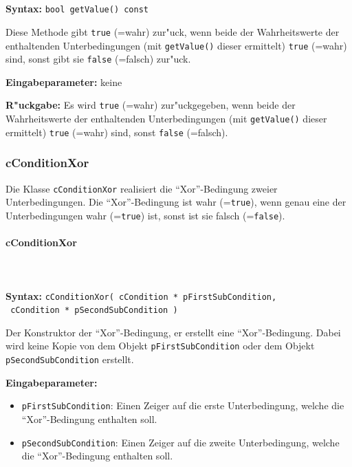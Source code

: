 \ \\\\\noindent
\textbf{Syntax:} \verb|bool getValue() const|

\bigskip\noindent
Diese Methode gibt \verb|true| (=wahr) zur"uck, wenn beide der Wahrheitswerte der enthaltenden Unterbedingungen (mit \verb|getValue()| dieser ermittelt) \verb|true| (=wahr) sind, sonst gibt sie \verb|false| (=falsch) zur"uck.

\bigskip\noindent
\textbf{Eingabeparameter:} keine

\bigskip\noindent
\textbf{R"uckgabe:} Es wird \verb|true| (=wahr) zur"uckgegeben, wenn beide der Wahrheitswerte der enthaltenden Unterbedingungen (mit \verb|getValue()| dieser ermittelt) \verb|true| (=wahr) sind, sonst \verb|false| (=falsch).


\subsubsection{cConditionXor}

Die Klasse \verb|cConditionXor| realisiert die ``Xor''-Bedingung zweier Unterbedingungen. Die ``Xor''-Bedingung ist wahr (=\verb|true|), wenn genau eine der Unterbedingungen wahr (=\verb|true|) ist, sonst ist sie falsch  (=\verb|false|).

\paragraph{cConditionXor}

\ \\\\\noindent
\textbf{Syntax:} \verb|cConditionXor( cCondition * pFirstSubCondition,| \\\verb| cCondition * pSecondSubCondition )|

\bigskip\noindent
Der Konstruktor der ``Xor''-Bedingung, er erstellt eine ``Xor''-Bedingung. Dabei wird keine Kopie von dem Objekt \verb|pFirstSubCondition| oder dem Objekt \verb|pSecondSubCondition| erstellt.

\bigskip\noindent
\textbf{Eingabeparameter:}
\begin{itemize}
 \item \verb|pFirstSubCondition|: Einen Zeiger auf die erste Unterbedingung, welche die ``Xor''-Bedingung enthalten soll.
 \item \verb|pSecondSubCondition|: Einen Zeiger auf die zweite Unterbedingung, welche die ``Xor''-Bedingung enthalten soll.
\end{itemize}

